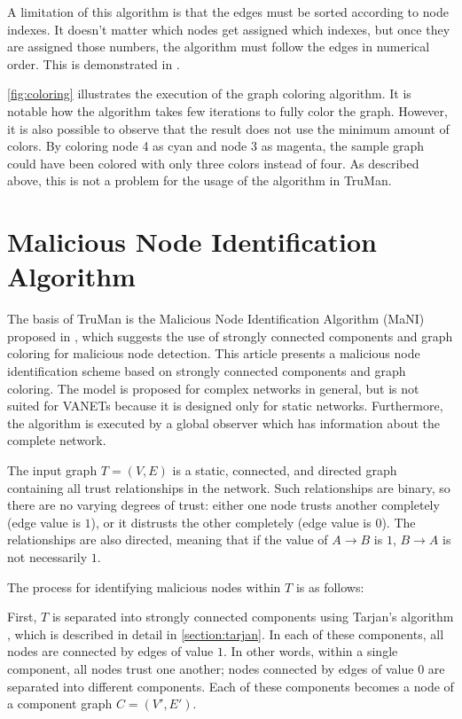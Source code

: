 A limitation of this algorithm is that the edges must be sorted according to node indexes.
It doesn't matter which nodes get assigned which indexes, but once they are assigned those numbers, the algorithm must follow the edges in numerical order.
This is demonstrated in \citep{vernize2013dissertation}.

\autoref{fig:coloring} illustrates the execution of the graph coloring algorithm.
It is notable how the algorithm takes few iterations to fully color the graph.
However, it is also possible to observe that the result does not use the minimum amount of colors.
By coloring node 4 as cyan and node 3 as magenta, the sample graph could have been colored with only three colors instead of four.
As described above, this is not a problem for the usage of the algorithm in TruMan.

\section{Malicious Node Identification Algorithm}

The basis of TruMan is the Malicious Node Identification Algorithm (MaNI) proposed in \citep{vernize2015malicious}, which suggests the use of strongly connected components and graph coloring for malicious node detection.
This article presents a malicious node identification scheme based on strongly connected components and graph coloring.
The model is proposed for complex networks in general, but is not suited for VANETs because it is designed only for static networks.
Furthermore, the algorithm is executed by a global observer which has information about the complete network.

The input graph $T = (V,E)$ is a static, connected, and directed graph containing all trust relationships in the network.
Such relationships are binary, so there are no varying degrees of trust: either one node trusts another completely (edge value is $1$), or it distrusts the other completely (edge value is $0$).
The relationships are also directed, meaning that if the value of $A\rightarrow B$ is $1$, $B\rightarrow A$ is not necessarily $1$.

The process for identifying malicious nodes within $T$ is as follows:

First, $T$ is separated into strongly connected components using Tarjan's algorithm \citep{tarjan1972depth}, which is described in detail in \autoref{section:tarjan}.
In each of these components, all nodes are connected by edges of value $1$.
In other words, within a single component, all nodes trust one another; nodes connected by edges of value $0$ are separated into different components.
Each of these components becomes a node of a component graph $C = (V', E')$.

